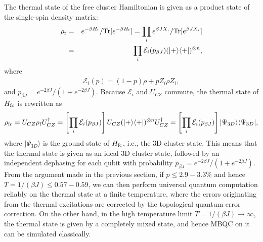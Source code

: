 The thermal state of the free cluster Hamiltonian is given as a product state of the single-spin density matrix:
\begin{eqnarray}
\rho _{\rm f} &=& e^{- \beta H_{\rm f}}/{\rm Tr}[e^{- \beta H_{\rm f}}] = \prod _{i} e^{\beta J X_i}/{\rm Tr}[e^{\beta J X_i}]
\\
&=& \prod _{i} \mathcal{E}_i(p_{\beta J}) (|+\rangle \langle +|)^{\otimes n},
\end{eqnarray}
where 
\begin{eqnarray}
\mathcal{E}_i(p) = (1-p) \rho + p Z_i \rho Z_i,
\end{eqnarray}
and $p_{\beta J} = e^{- 2 \beta J }/(1+e^{- 2 \beta J })$.
Because $\mathcal{E}_i$ and $U_{CZ}$ commute, the thermal state of $H_{\rm fc}$ is rewritten as
\begin{eqnarray}
\rho _{\rm fc} = U_{CZ} \rho _{\rm f} U_{CZ} ^{\dag} =\left[ \prod _{i} \mathcal{E}_i (p_{\beta J}) \right] U_{CZ} (|+\rangle \langle +|)^{\otimes n} U_{CZ}^{\dag}
=\left[ \prod _{i} \mathcal{E}_i (p_{\beta J}) \right]  |\Psi _{3D} \rangle \langle \Psi _{3D} |,
  \nonumber
\\
\end{eqnarray}
where $|\Psi _{3D}\rangle$ is the ground state of $H_{\rm fc}$, i.e., the 3D cluster state.
This means that the thermal state is given as an ideal 3D cluster state, followed by an independent dephasing for each qubit with probability 
$p_{\beta J}=e^{- 2 \beta J }/(1+e^{- 2 \beta J })$.
From the argument made in the previous section, if $p \leq 2.9-3.3\%$ and hence $T = 1/(\beta J) \leq 0.57-0.59$, we can then perform universal quantum computation reliably on the thermal state at a finite temperature, where the errors originating from the thermal excitations are corrected by the topological quantum error correction.
On the other hand, in the high temperature limit $T=1/(\beta J) \rightarrow \infty$, the thermal state is given by a completely mixed state, and hence MBQC on it can be simulated classically.

